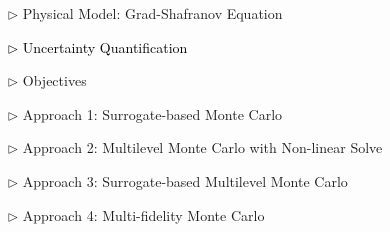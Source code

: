 \documentclass{beamer}
\begin{document}
\begin{frame}[c]
\large 	
\textcolor{mygray1}{
    \begin{itemize}[leftmargin=5pt] 
        \item[$\triangleright$]  Physical Model: Grad-Shafranov Equation
        \vspace{0.2cm}	
        \item[\textcolor{black}{$\triangleright$}] \textcolor{black}{\fontsize{25}{60}\selectfont Uncertainty Quantification}
        \vspace{0.2cm}
        \item[$\triangleright$] Objectives
        \vspace{0.2cm}
        \item[$\triangleright$] Approach 1: Surrogate-based Monte Carlo
        \vspace{0.2cm}
        \item[$\triangleright$] Approach 2: Multilevel Monte Carlo with Non-linear Solve
        \vspace{0.2cm}
        \item[$\triangleright$] Approach 3: Surrogate-based Multilevel Monte Carlo
        \vspace{0.2cm}
        \item[$\triangleright$] Approach 4: Multi-fidelity Monte Carlo
    \end{itemize}
}
\end{frame}
\end{document}
